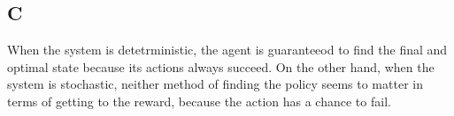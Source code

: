 \documentclass{article}
\begin{document}
\subsection{C}
When the system is detetrministic, the agent is guaranteeod to find the final and
optimal state because its actions always succeed. On the other hand, when the 
system is stochastic, neither method of finding the policy seems to matter in terms
of getting to the reward, because the action has a chance to fail.
\end{document}
